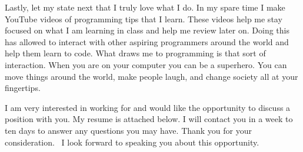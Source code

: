 \documentclass{my_cv}
\begin{document}
Lastly, let my state next that I truly love what I do.  In my spare time
I make YouTube videos of programming tips that I learn.  These videos
help me stay focused on what I am learning in class and help me review
later on.  Doing this has allowed to interact with other aspiring
programmers around the world and help them learn to code.  What draws me
to programming is that sort of interaction.  When you are on your
computer you can be a superhero.  You can move things around the world,
make people laugh, and change society all at your fingertips.

I am very interested in working for \companyName and would like the
opportunity to discuss a position with you.  My resume is attached
below.  I will contact you in a week to ten days to answer any questions
you may have. Thank you for your consideration.   I look forward to
speaking you about this opportunity. 

\makeletterclosing
\end{document}
